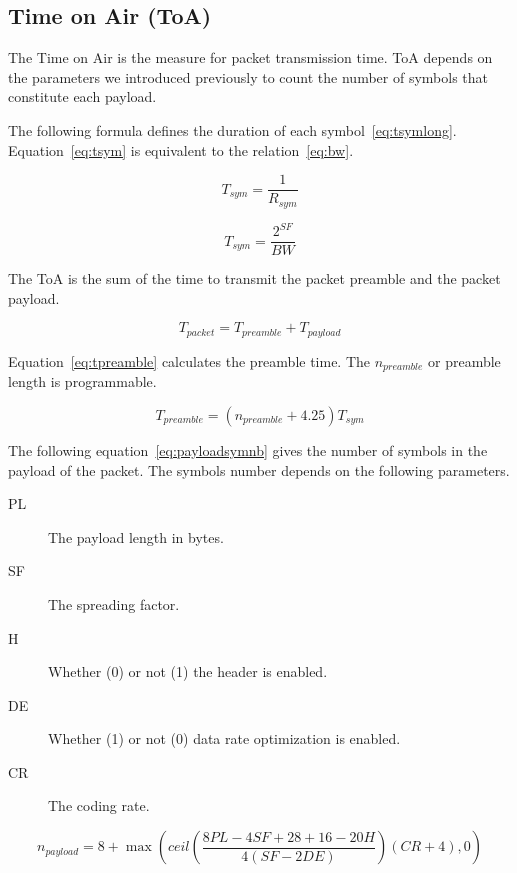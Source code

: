 \subsection{Time on Air (ToA)}

The Time on Air is the measure for packet transmission time.
ToA depends on the parameters we introduced previously to count the number of
symbols that constitute each payload.

The following formula defines the duration of each symbol~\ref{eq:tsymlong}.
Equation~\ref{eq:tsym} is equivalent to the relation~\ref{eq:bw}.

\begin{equation}
  \label{eq:tsymlong}
  T_{sym} = \frac{1}{R_{sym}}
\end{equation}

\begin{equation}
  \label{eq:tsym}
  T_{sym} = \frac{2^{SF}}{BW}
\end{equation}

The ToA is the sum of the time to transmit the packet preamble and the packet
payload.

\begin{equation}
  \label{eq:tpacket}
  T_{packet} = T_{preamble} + T_{payload}
\end{equation}

Equation~\ref{eq:tpreamble} calculates the preamble time. The $n_{preamble}$
or preamble length is programmable.

\begin{equation}
  \label{eq:tpreamble}
  T_{preamble} = (n_{preamble} + 4.25)T_{sym}
\end{equation}

The following equation~\ref{eq:payloadsymnb} gives the number of symbols in the
payload of the packet.
The symbols number depends on the following parameters.

\begin{description}
  \item[PL] The payload length in bytes.
  \item[SF] The spreading factor.
  \item[H] Whether (0) or not (1) the header is enabled.
  \item[DE] Whether (1) or not (0) data rate optimization is enabled.
  \item[CR] The coding rate.
\end{description}

\begin{equation}
  \label{eq:payloadsymnb}
  n_{payload} = 8 + \max(ceil(\frac{8PL - 4SF + 28 + 16 - 20H}{4(SF - 2DE)})(CR + 4),0)
\end{equation}

